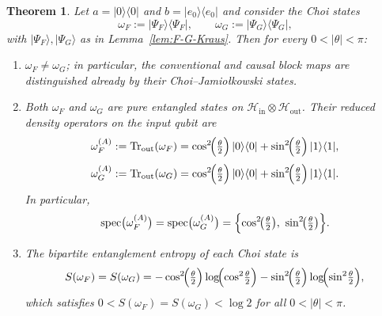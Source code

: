 \documentclass[11pt, reco]{article}
\newtheorem{theorem}{Theorem}[section]
\begin{document}
\begin{theorem}\label{thm:F-G-entanglement}
Let \(a=|0\rangle\langle 0|\) and \(b=|e_0\rangle\langle e_0|\) and consider the Choi states
\[
\omega_F:=|\Psi_F\rangle\langle\Psi_F|,
\qquad
\omega_G:=|\Psi_G\rangle\langle\Psi_G|,
\]
with \(|\Psi_F\rangle,|\Psi_G\rangle\) as in Lemma~\ref{lem:F-G-Kraus}. Then for every \(0<|\theta|<\pi\):
\begin{enumerate}
\item \(\omega_F\neq \omega_G\); in particular, the conventional and causal block maps are distinguished already by their Choi–Jamiołkowski states.

\item Both \(\omega_F\) and \(\omega_G\) are pure entangled states on \(\mathcal{H}_{\mathrm{in}}\otimes\mathcal{H}_{\mathrm{out}}\). Their reduced density operators on the input qubit are
\[
\omega_F^{(A)}:=\operatorname{Tr}_{\mathrm{out}}(\omega_F)
=
\cos^2\!\Bigl(\tfrac{\theta}{2}\Bigr)\,|0\rangle\langle 0|
+
\sin^2\!\Bigl(\tfrac{\theta}{2}\Bigr)\,|1\rangle\langle 1|,
\]
\[
\omega_G^{(A)}:=\operatorname{Tr}_{\mathrm{out}}(\omega_G)
=
\cos^2\!\Bigl(\tfrac{\theta}{2}\Bigr)\,|0\rangle\langle 0|
+
\sin^2\!\Bigl(\tfrac{\theta}{2}\Bigr)\,|1\rangle\langle 1|.
\]
In particular,
\[
\operatorname{spec}\bigl(\omega_F^{(A)}\bigr)
=
\operatorname{spec}\bigl(\omega_G^{(A)}\bigr)
=
\Bigl\{\cos^2\!\bigl(\tfrac{\theta}{2}\bigr),\ \sin^2\!\bigl(\tfrac{\theta}{2}\bigr)\Bigr\}.
\]

\item The bipartite entanglement entropy of each Choi state is
\[
S(\omega_F)
=
S(\omega_G)
=
-\cos^2\!\Bigl(\tfrac{\theta}{2}\Bigr)\log\!\Bigl(\cos^2\!\tfrac{\theta}{2}\Bigr)
-\sin^2\!\Bigl(\tfrac{\theta}{2}\Bigr)\log\!\Bigl(\sin^2\!\tfrac{\theta}{2}\Bigr),
\]
which satisfies
\(
0<S(\omega_F)=S(\omega_G)<\log 2
\)
for all \(0<|\theta|<\pi\).
\end{enumerate}
\end{theorem}
\end{document}
